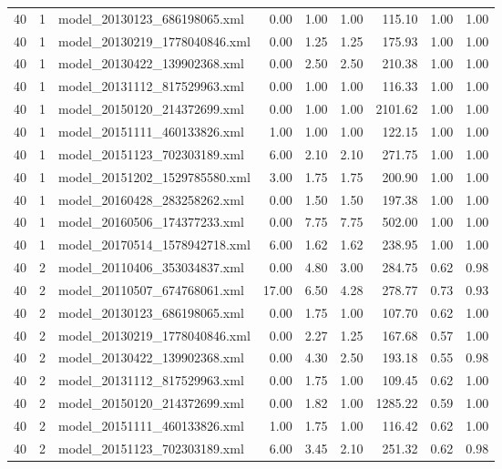 \begin{table}[ht]
\begin{tabular}{rrlrrrrrr}
   40 &   1 & model\_20130123\_686198065.xml & 0.00 & 1.00 & 1.00 & 115.10 & 1.00 & 1.00 \\ 
   40 &   1 & model\_20130219\_1778040846.xml & 0.00 & 1.25 & 1.25 & 175.93 & 1.00 & 1.00 \\ 
   40 &   1 & model\_20130422\_139902368.xml & 0.00 & 2.50 & 2.50 & 210.38 & 1.00 & 1.00 \\ 
   40 &   1 & model\_20131112\_817529963.xml & 0.00 & 1.00 & 1.00 & 116.33 & 1.00 & 1.00 \\ 
   40 &   1 & model\_20150120\_214372699.xml & 0.00 & 1.00 & 1.00 & 2101.62 & 1.00 & 1.00 \\ 
   40 &   1 & model\_20151111\_460133826.xml & 1.00 & 1.00 & 1.00 & 122.15 & 1.00 & 1.00 \\ 
   40 &   1 & model\_20151123\_702303189.xml & 6.00 & 2.10 & 2.10 & 271.75 & 1.00 & 1.00 \\ 
   40 &   1 & model\_20151202\_1529785580.xml & 3.00 & 1.75 & 1.75 & 200.90 & 1.00 & 1.00 \\ 
   40 &   1 & model\_20160428\_283258262.xml & 0.00 & 1.50 & 1.50 & 197.38 & 1.00 & 1.00 \\ 
   40 &   1 & model\_20160506\_174377233.xml & 0.00 & 7.75 & 7.75 & 502.00 & 1.00 & 1.00 \\ 
   40 &   1 & model\_20170514\_1578942718.xml & 6.00 & 1.62 & 1.62 & 238.95 & 1.00 & 1.00 \\ 
   40 &   2 & model\_20110406\_353034837.xml & 0.00 & 4.80 & 3.00 & 284.75 & 0.62 & 0.98 \\ 
   40 &   2 & model\_20110507\_674768061.xml & 17.00 & 6.50 & 4.28 & 278.77 & 0.73 & 0.93 \\ 
   40 &   2 & model\_20130123\_686198065.xml & 0.00 & 1.75 & 1.00 & 107.70 & 0.62 & 1.00 \\ 
   40 &   2 & model\_20130219\_1778040846.xml & 0.00 & 2.27 & 1.25 & 167.68 & 0.57 & 1.00 \\ 
   40 &   2 & model\_20130422\_139902368.xml & 0.00 & 4.30 & 2.50 & 193.18 & 0.55 & 0.98 \\ 
   40 &   2 & model\_20131112\_817529963.xml & 0.00 & 1.75 & 1.00 & 109.45 & 0.62 & 1.00 \\ 
   40 &   2 & model\_20150120\_214372699.xml & 0.00 & 1.82 & 1.00 & 1285.22 & 0.59 & 1.00 \\ 
   40 &   2 & model\_20151111\_460133826.xml & 1.00 & 1.75 & 1.00 & 116.42 & 0.62 & 1.00 \\ 
   40 &   2 & model\_20151123\_702303189.xml & 6.00 & 3.45 & 2.10 & 251.32 & 0.62 & 0.98 \\ 

\end{tabular}
\end{table}
